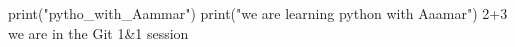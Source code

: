 print("pytho_with_Aammar")
print("we are learning python with Aaamar")
2+3
 we are in the Git 1&1 session



